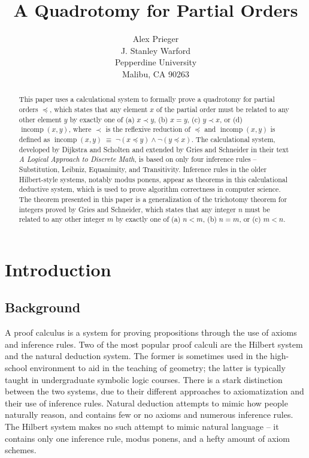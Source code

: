 \documentclass[12pt, fleqn, leqno]{article}
\title{A Quadrotomy for Partial Orders}
\author{
   Alex Prieger\\
   J. Stanley Warford\\
   Pepperdine University\\
   Malibu, CA 90263}
\date{} %
\newcommand{\equivs}{\ensuremath{\;\equiv\;}}       %
\DeclareMathOperator{\incomp}{incomp}
\begin{document}
\maketitle
\begin{abstract}

This paper uses a calculational system to formally prove a quadrotomy for partial orders $\preceq$, which states that any element $x$ of the partial order must be related to any other element $y$ by exactly one of (a) $x \prec y$, (b) $x=y$, (c) $y\prec x$, or (d) $\incomp(x,y)$, where $\prec$ is the reflexive reduction of $\preceq$ and $\incomp(x,y)$ is defined as $\incomp(x,y) \equivs \neg (x\preceq y) \land \neg (y\preceq x)$.
The calculational system, developed by Dijkstra and Scholten and extended by Gries and Schneider in their text \textit{A Logical Approach to Discrete Math}, is based on only four inference rules -- Substitution, Leibniz, Equanimity, and Transitivity. 
Inference rules in the older Hilbert-style systems, notably modus ponens, appear as theorems in this calculational deductive system, which is used to prove algorithm correctness in computer science.
The theorem presented in this paper is a generalization of the trichotomy theorem for integers proved by Gries and Schneider, which states that any integer $n$ must be related to any other integer $m$ by exactly one of (a) $n<m$, (b) $n=m$, or (c) $m<n$.

\end{abstract}

\thispagestyle{plain}

\section{Introduction}

\subsection{Background}

A proof calculus is a system for proving propositions through the use of axioms and inference rules. Two of the most popular proof calculi are the Hilbert system and the natural deduction system. The former is sometimes used in the high-school environment to aid in the teaching of geometry; the latter is typically taught in undergraduate symbolic logic courses. There is a stark distinction between the two systems, due to their different approaches to axiomatization and their use of inference rules. Natural deduction attempts to mimic how people naturally reason, and contains few or no axioms and numerous inference rules. The Hilbert system makes no such attempt to mimic natural language -- it contains only one inference rule, modus ponens, and a hefty amount of axiom schemes.
\end{document}
